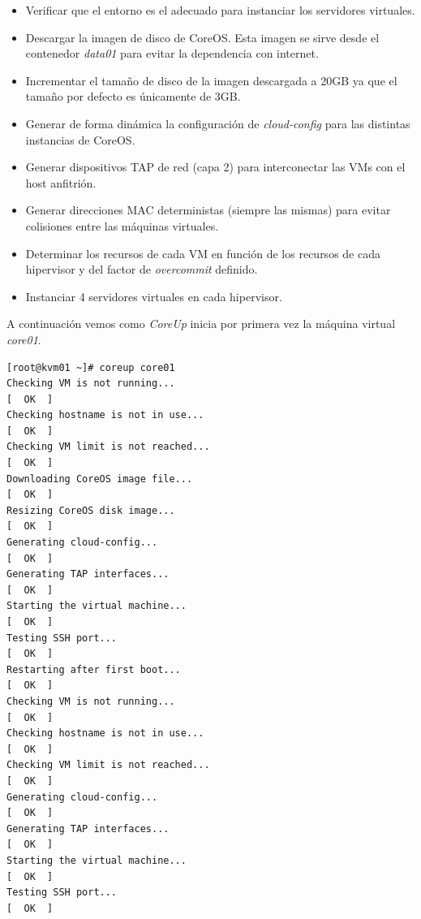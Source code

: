 \documentclass[a4paper,12pt,spanish,final]{epsc_tfc_pfc}
\begin{document}
\begin{itemize}
  \item Verificar que el entorno es el adecuado para instanciar los servidores virtuales.
  \item Descargar la imagen de disco de CoreOS\@. Esta imagen se sirve desde el contenedor \emph{data01} para evitar la dependencia con internet.
  \item Incrementar el tamaño de disco de la imagen descargada a 20GB ya que el tamaño por defecto es únicamente de 3GB.
  \item Generar de forma dinámica la configuración de \emph{cloud-config} para las distintas instancias de CoreOS.
  \item Generar dispositivos TAP de red (capa 2) para interconectar las VMs con el host anfitrión.
  \item Generar direcciones MAC deterministas (siempre las mismas) para evitar colisiones entre las máquinas virtuales.
  \item Determinar los recursos de cada VM en función de los recursos de cada hipervisor y del factor de \emph{overcommit} definido.
  \item Instanciar 4 servidores virtuales en cada hipervisor.
\end{itemize}

A continuación vemos como \emph{CoreUp} inicia por primera vez la máquina virtual \emph{core01}.
\\

\begin{lstlisting}[style=dnsmasq]
[root@kvm01 ~]# coreup core01
Checking VM is not running...                                                           [  OK  ]
Checking hostname is not in use...                                                      [  OK  ]
Checking VM limit is not reached...                                                     [  OK  ]
Downloading CoreOS image file...                                                        [  OK  ]
Resizing CoreOS disk image...                                                           [  OK  ]
Generating cloud-config...                                                              [  OK  ]
Generating TAP interfaces...                                                            [  OK  ]
Starting the virtual machine...                                                         [  OK  ]
Testing SSH port...                                                                     [  OK  ]
Restarting after first boot...                                                          [  OK  ]
Checking VM is not running...                                                           [  OK  ]
Checking hostname is not in use...                                                      [  OK  ]
Checking VM limit is not reached...                                                     [  OK  ]
Generating cloud-config...                                                              [  OK  ]
Generating TAP interfaces...                                                            [  OK  ]
Starting the virtual machine...                                                         [  OK  ]
Testing SSH port...                                                                     [  OK  ]
\end{lstlisting}
\end{document}
